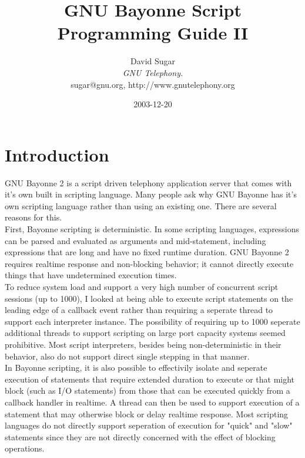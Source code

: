 \documentclass[a4paper,12pt]{article}
\date{2003-12-20}
\title{GNU Bayonne Script Programming Guide II}
\author{
David Sugar \\
{\em GNU Telephony.}\\
{\normalsize sugar@gnu.org, http://www.gnutelephony.org} \\
}
\begin{document}

\maketitle

\tableofcontents

\newpage

\section{Introduction}

GNU Bayonne 2 is a script driven telephony application server that comes
with it's own built in scripting language.  Many people ask why GNU
Bayonne has it's own scripting language rather than using an existing
one.  There are several reasons for this. \\

First, Bayonne scripting is deterministic.  In some scripting languages,
expressions can be parsed and evaluated as arguments and mid-statement,
including expressions that are long and have no fixed runtime duration.  
GNU Bayonne 2 requires realtime response and non-blocking behavior; it
cannot directly execute things that have undetermined execution times. \\

To reduce system load and support a very high number of concurrent
script sessions (up to 1000), I looked at being able to execute script
statements on the leading edge of a callback event rather than requiring
a seperate thread to support each interpreter instance.  The possibility
of requiring up to 1000 seperate additional threads to support scripting
on large port capacity systems seemed prohibitive.  Most script
interpreters, besides being non-deterministic in their behavior, also do
not support direct single stepping in that manner. \\

In Bayonne scripting, it is also possible to effectivily isolate and
seperate execution of statements that require extended duration to
execute or that might block (such as I/O statements) from those that can
be executed quickly from a callback handler in realtime.  A thread can
then be used to support execution of a statement that may otherwise
block or delay realtime response.  Most scripting languages do not
directly support seperation of execution for "quick" and "slow"
statements since they are not directly concerned with the effect of
blocking operations. \\
\end{document}
